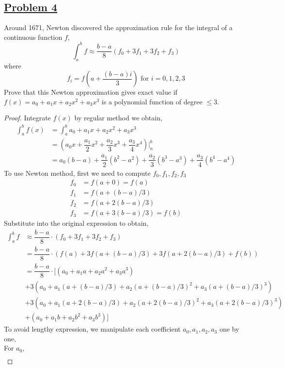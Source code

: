 \documentclass[10pt,letterpaper]{article}
\begin{document}
	\subsection*{{\color{purple}\underline{Problem 4}}}
	Around 1671, Newton discovered the approximation rule for the integral of a continuous function $f$,
	$$\displaystyle\int_a^b f \approx \dfrac{b - a}{8}(f_0 + 3f_1 + 3f_2 + f_3)$$
	where 
	$$f_i = f(a + \dfrac{(b - a)i}{3}) \text{ for } i = 0, 1, 2, 3$$
	Prove that this Newton approximation gives exact value if $f(x) = a_0 + a_1x + a_2x^2 + a_3x^3$ is 
	a polynomial function of degree $\leq 3$.
\begin{proof}
	Integrate $f(x)$ by regular method we obtain,
	\begin{align*}
\displaystyle\int_{a}^{b} f(x) &= 
\displaystyle\int_{a}^{b} a_0 + a_1x + a_2x^2 + a_3x^3 \\
&= (a_0x + \dfrac{a_1}{2} x^2 + \dfrac{a_2}{3}x^3 + \dfrac{a_3}{4} x^4)\bigg|_{a}^{b} \\
&= a_0(b - a) + \dfrac{a_1}{2}(b^2 - a^2) + \dfrac{a_2}{3}(b^3 - a^3) 
+ \dfrac{a_3}{4}(b^4 - a^4)
	\end{align*}
	To use Newton method, first we need to compute $f_0, f_1, f_2, f_3$
\begin{align*}
	f_0 &= f(a + 0) = f(a) \\
	f_1 &= f(a + (b-a)/3) \\
	f_2 &= f(a + 2(b-a)/3) \\
	f_3 &= f(a + 3(b - a)/3) = f(b) 		
\end{align*}		
	Substitute into the original expression to obtain,
\begin{align*}
	\displaystyle\int_a^b f &\approx \dfrac{b - a}{8} \cdot (f_0 + 3f_1 + 3f_2 + f_3) \\
&= \dfrac{b-a}{8} \cdot (f(a) + 3f(a + (b-a)/3) + 3f(a + 2(b-a)/3) + f(b)) \\
&= \dfrac{b-a}{8} \cdot \bigg[ 
(a_0 + a_1a + a_2a^2 + a_3a^3) \\ 
&+ 3(a_0 + a_1(a + (b-a)/3) + a_2(a + (b-a)/3)^2 + a_3(a + (b-a)/3)^3) \\
&+ 3(a_0 + a_1(a + 2(b-a)/3) + a_2(a + 2(b-a)/3)^2 + a_3(a + 2(b-a)/3)^3)\\
&+ (a_0 + a_1b + a_2b^2 + a_3b^3)\bigg]
\end{align*}	
	To avoid lengthy expression, we manipulate each coefficient $a_0, a_1, a_2, a_3$ one by one, \\
	For $a_0$,
\begin{align*}

\end{align*}
\end{proof}
\end{document}

